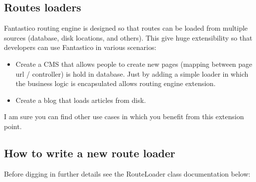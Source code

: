 \documentclass[letterpaper,10pt,english]{sphinxmanual}
\begin{document}
\subsection{Routes loaders}
\label{features/routing_engine:routes-loaders}
Fantastico routing engine is designed so that routes can be loaded from multiple sources (database, disk locations, and others).
This give huge extensibility so that developers can use Fantastico in various scenarios:
\begin{itemize}
\item {} 
Create a CMS that allows people to create new pages (mapping between page url / controller) is hold in database. Just by
adding a simple loader in which the business logic is encapsulated allows routing engine extension.

\item {} 
Create a blog that loads articles from disk.

\end{itemize}

I am sure you can find other use cases in which you benefit from this extension point.


\subsection{How to write a new route loader}
\label{features/routing_engine:how-to-write-a-new-route-loader}
Before digging in further details see the RouteLoader class documentation below:
\end{document}
